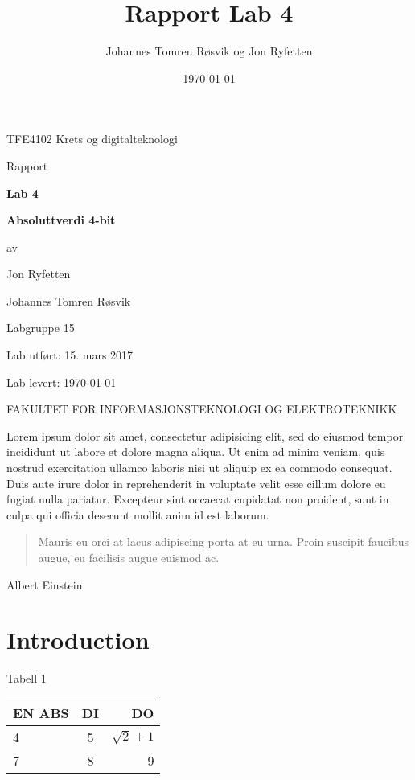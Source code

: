 \documentclass{article}
\title{Rapport Lab 4}
\author{Johannes Tomren Røsvik og Jon Ryfetten}
\date{\today}
\begin{document}
\begin{titlepage}
	\centering
	{\LARGE TFE4102 Krets og digitalteknologi \par}
	\vspace{1cm}
	{\Large Rapport\par}
	\vspace{1.5cm}
	{\huge\bfseries Lab 4\par}
	{\huge\bfseries Absoluttverdi 4-bit\par}
	\vspace{2cm}
	{av\par}
	{\Large Jon Ryfetten\par}
	{\Large Johannes Tomren Røsvik\par}
	\vspace{1cm}
	{\large Labgruppe 15 \par}
	\vfill
	{\large Lab utført: 15. mars 2017 \par}
	{\large Lab levert: \today \par}
	\vfill
	{FAKULTET FOR INFORMASJONSTEKNOLOGI OG ELEKTROTEKNIKK \par}
\end{titlepage}


Lorem ipsum dolor sit amet, consectetur adipisicing elit, sed do eiusmod tempor incididunt ut labore et dolore magna aliqua. Ut enim ad minim veniam, quis nostrud exercitation ullamco laboris nisi ut aliquip ex ea commodo consequat. Duis aute irure dolor in reprehenderit in voluptate velit esse cillum dolore eu fugiat nulla pariatur. Excepteur sint occaecat cupidatat non proident, sunt in culpa qui officia deserunt mollit anim id est laborum.

\begin{quote}
	Mauris eu orci at lacus adipiscing porta at eu urna. Proin suscipit faucibus augue, eu facilisis augue euismod ac.
\end{quote}
\begin{center}
	Albert Einstein
\end{center}

\section{Introduction}

\begin{center}
	Tabell 1
\end{center}
\begin{center} %
	\begin{tabular} {| l | c | r |} \hline
			EN ABS 	& DI 	& DO \\ \hline
			4 			& 5 	& $\sqrt{2} + 1$ \\ \hline
			7 			& 8 	& 9 \\ \hline
	\end{tabular}
\end{center}
\end{document}
